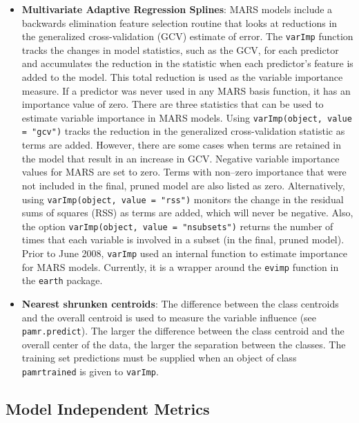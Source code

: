 \documentclass[12pt]{article}
\begin{document}
\begin{itemize}
  \item {\bf Multivariate Adaptive Regression Splines}: MARS models 
        include a backwards elimination feature selection routine that
        looks at reductions in the generalized cross-validation (GCV)
        estimate of error. The \texttt{varImp} function tracks the changes in
        model statistics, such as the GCV, for each predictor and
        accumulates the reduction in the statistic when each
        predictor's feature is added to the model. This total reduction
        is used as the variable importance measure. If a predictor was
        never used in any MARS basis function, it has an importance
        value of zero. There are three statistics that can be used to
        estimate variable importance in MARS models. Using
        \texttt{varImp(object, value = "gcv")} tracks the reduction in the
        generalized cross-validation statistic as terms are added.
        However, there are some cases when terms are retained 
        in the model that result in an increase in GCV. Negative variable 
        importance values for MARS are set to zero. Terms with non--zero importance that were not included
        in the final, pruned model are also listed as zero. 
        Alternatively, using
        \texttt{varImp(object, value = "rss")} monitors the change in the
        residual sums of squares (RSS) as terms are added, which will
        never be negative. 
        Also, the option \texttt{varImp(object, value = "nsubsets")} 
        returns the number of times that each variable is involved in a subset (in the final, pruned model).  
        Prior to June 2008, \texttt{varImp} used an internal function to estimate
        importance for MARS models. Currently, it is a wrapper around the 
       \texttt{evimp} function in the \texttt{earth} package.
   
  \item {\bf Nearest shrunken centroids}: The difference between the class
        centroids and the overall centroid is used to measure the
        variable influence (see \texttt{pamr.predict}). The larger the
        difference between   the class centroid and the overall center
        of the data, the larger the separation between the classes. The
        training set predictions must be supplied when an object of
        class \texttt{pamrtrained} is given to \texttt{varImp}. 

\end{itemize}   

\subsection{Model Independent Metrics}
\end{document}
